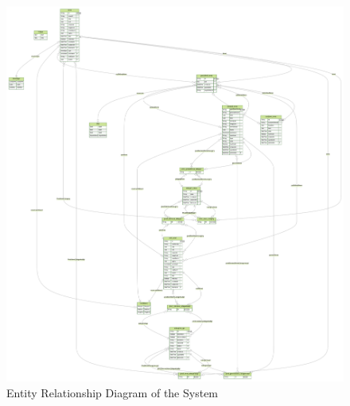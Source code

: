 \documentclass[12pt]{report}
\begin{document}
\clearpage %
\begin{figure}[p] %
\centering %
\includegraphics[width=\textwidth,height=\textheight,keepaspectratio]{ERD.png} %
\caption{Entity Relationship Diagram of the System} %
\label{fig:er_diagram} %
\end{figure}
\clearpage %
\end{document}
